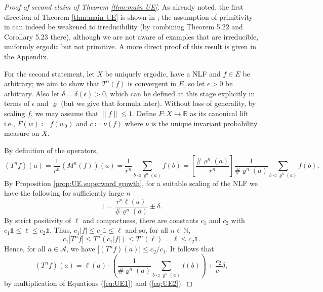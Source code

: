 \documentclass[11pt]{amsart}
\numberwithin{equation}{section}
\theoremstyle{plain}
\theoremstyle{definition}
\newcommand{\R}{{\mathbb R}}
\newcommand{\N}{{\mathbb N}}
\newcommand{\mc}{\mathcal}
\newcommand{\A}{\mc A}
\newcommand{\sub}{\varrho}
\newcommand{\bbo}{\mathds{1}} %
\begin{document}
\begin{proof}[Proof of second claim of Theorem \ref{thm:main UE}]
As already noted, the first direction of Theorem \ref{thm:main UE} is shown in \cite{MRW25}; the assumption of primitivity in \cite[Theorem 1.1]{MRW25} can indeed be weakened to irreducibility (by combining Theorem 5.22 and Corollary 5.23 there), although we are not aware of examples that are irreducible, uniformly ergodic but not primitive. A more direct proof of this result is given in the Appendix.

For the second statement, let \(X\) be uniquely ergodic, have a NLF and \(f \in E\) be arbitrary; we aim to show that \(T^n(f)\) is convergent in \(E\), so let \(\epsilon > 0\) be arbitrary. Also let \(\delta = \delta(\epsilon) > 0\), which can be defined at this stage explicitly in terms of \(\epsilon\) and \(\sub\) (but we give that formula later). Without loss of generality, by scaling \(f\), we may assume that \(\|f\| \leq 1\). Define \(F \colon X \to \R\) as its canonical lift i.e., \(F(w) \coloneqq f(w_0)\) and \(c \coloneqq \nu(f)\) where \(\nu\) is the unique invariant probability measure on \(X\).

By definition of the operators,
\begin{equation}\label{eq:UE1}
(T^n f)(a) = \frac{1}{r^n}(M^n(f))(a) = \frac{1}{r^n} \sum_{b \triangleleft \sub^n(a)} f(b) = \left[ \frac{ \# \sub^n(a)}{r^n} \right] \frac{1}{ \# \sub^n(a) } \sum_{b \triangleleft \sub^n(a)} f(b) .
\end{equation}
By Proposition \ref{prop:UE superword growth}, for a suitable scaling of the NLF we have the following for sufficiently large \(n\)
\begin{equation}\label{eq:UE2}
1 = \frac{r^n \ell(a)}{ \# \sub^n(a)} \pm \delta .
\end{equation}
By strict positivity of \(\ell\) and compactness, there are constants \(c_1\) and \(c_2\) with \(c_1 \bbo \leq \ell \leq c_2\bbo \). Thus, \(c_1 |f| \leq c_1 \bbo \leq \ell\) and so, for all \(n \in \N\),
\[
c_1 |T^n f| \leq T^n(c_1 |f|) \leq T^n(\ell) = \ell \leq c_2 \bbo .
\]
Hence, for all \(a \in \A\), we have \(|(T^n f)(a)| \leq c_2 / c_1\). It follows that
\begin{equation}\label{eq:UE3}
(T^n f)(a) = \ell(a) \cdot \left( \frac{1}{ \# \sub^n(a) } \sum_{b \triangleleft \sub^n(a)} f(b) \right) \pm \frac{c_2}{c_1} \delta ,
\end{equation}
by multiplication of Equations (\ref{eq:UE1}) and (\ref{eq:UE2}).


\end{proof}
\end{document}
